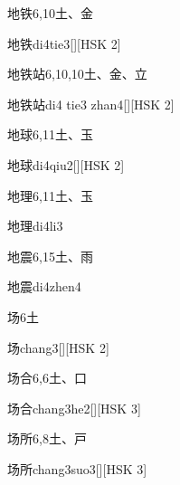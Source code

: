 \begin{entry}{地铁}{6,10}{⼟、⾦}
  \begin{phonetics}{地铁}{di4tie3}[][HSK 2]
  \end{phonetics}
\end{entry}

\begin{entry}{地铁站}{6,10,10}{⼟、⾦、⽴}
  \begin{phonetics}{地铁站}{di4 tie3 zhan4}[][HSK 2]
  \end{phonetics}
\end{entry}

\begin{entry}{地球}{6,11}{⼟、⽟}
  \begin{phonetics}{地球}{di4qiu2}[][HSK 2]
  \end{phonetics}
\end{entry}

\begin{entry}{地理}{6,11}{⼟、⽟}
  \begin{phonetics}{地理}{di4li3}
  \end{phonetics}
\end{entry}

\begin{entry}{地震}{6,15}{⼟、⾬}
  \begin{phonetics}{地震}{di4zhen4}
  \end{phonetics}
\end{entry}

\begin{entry}{场}{6}{⼟}
  \begin{phonetics}{场}{chang3}[][HSK 2]
  \end{phonetics}
\end{entry}

\begin{entry}{场合}{6,6}{⼟、⼝}
  \begin{phonetics}{场合}{chang3he2}[][HSK 3]
  \end{phonetics}
\end{entry}

\begin{entry}{场所}{6,8}{⼟、⼾}
  \begin{phonetics}{场所}{chang3suo3}[][HSK 3]
  \end{phonetics}
\end{entry}

